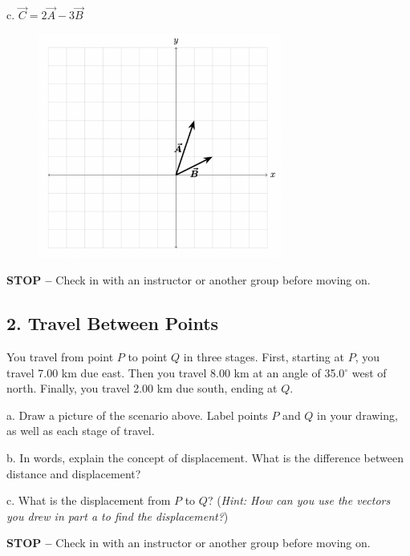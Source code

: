 \documentclass{article}
\begin{document}
\vspace{4cm}

\noindent c. $\vec{C} = 2\vec{A} - 3\vec{B}$
\begin{figure}[h!]
    \centering
    \includegraphics[width=8cm]{case3.png}
\end{figure}

\vspace*{\vfill}
\begin{tcolorbox}[colback=green!5,colframe=green!75!black]
\textbf{STOP -- } Check in with an instructor or another group before moving on.
\end{tcolorbox}

\newpage

\subsection*{2. Travel Between Points}
You travel from point $P$ to point $Q$ in three stages. First, starting at $P$, you travel 7.00 km due east. Then you travel 8.00 km at an angle of 35.0$^\circ$ west of north. Finally, you travel 2.00 km due south, ending at $Q$.
\vspace{0.5cm}

\noindent a. Draw a picture of the scenario above. Label points $P$ and $Q$ in your drawing, as well as each stage of travel. 
\vspace{5cm}

\noindent b. In words, explain the concept of displacement. What is the difference between distance and displacement?

\vspace{5cm}

\noindent c. What is the displacement from $P$ to $Q$? (\textit{Hint: How can you use the vectors you drew in part a to find the displacement?})
\vspace*{\vfill}
\begin{tcolorbox}[colback=green!5,colframe=green!75!black]
\textbf{STOP -- } Check in with an instructor or another group before moving on.
\end{tcolorbox}
\end{document}
